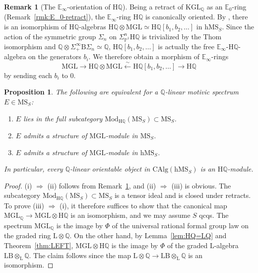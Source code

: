 \documentclass{amsart}
\numberwithin{equation}{section}
\theoremstyle{plain}
\newtheorem{proposition}[equation]{Proposition}
\theoremstyle{definition}
\newtheorem{remark}[equation]{Remark}
\let\bb=\mathbb
\let\rm=\mathrm
\def\Z{\bb Z}
\def\Q{\bb Q}
\def\P{\bb P}
\def\h{\mathrm h}
\def\L{\mathrm{L}{}}
\def\LB{\mathrm{LB}{}}
\def\HH{\mathrm{H}}
\def\E{\mathbb{E}}
\let\cat=\mathrm
\def\MGL{\mathrm{MGL}}
\def\PMGL{\mathrm{PMGL}}
\def\KGL{\mathrm{KGL}}
\def\Mod{\cat{M}\mathrm{od}{}}
\def\MS{\mathrm{MS}}
\def\CAlg{\mathrm{CAlg}{}}
\begin{document}
\begin{remark}[The $\E_\infty$-orientation of $\HH\Q$]
	\label{rmk:HQ-orientation}
	Being a retract of $\KGL_\Q$ as an $\E_0$-ring (Remark~\ref{rmk:E_0-retract}), the $\E_\infty$-ring $\HH\Q$ is canonically oriented.
	By \cite[Corollary 7.10]{AHI}, there is an isomorphism of $\HH\Q$-algebras $\HH\Q\otimes\MGL\simeq \HH\Q[b_1,b_2,\dotsc]$ in $\h\MS_S$.
	Since the action of the symmetric group $\Sigma_n$ on $\Sigma_{\P^1}^{n}\HH\Q$ is trivialized by the Thom isomorphism and $\Q\otimes\Sigma^\infty_+\rm B\Sigma_n\simeq \Q$, $\HH\Q[b_1,b_2,\dotsc]$ is actually the free $\E_\infty$-$\HH\Q$-algebra on the generators $b_i$. We therefore obtain a morphism of $\E_\infty$-rings
	\[
	\MGL \to \HH\Q\otimes\MGL \xleftarrow{\sim} \HH\Q[b_1,b_2,\dotsc] \to \HH\Q
	\]
	by sending each $b_i$ to $0$. %
\end{remark}

\begin{proposition}\label{prop:HQ-modules}
	The following are equivalent for a $\Q$-linear motivic spectrum $E\in \MS_S$:
	\begin{enumerate}
		\item $E$ lies in the full subcategory $\Mod_{\HH\Q}(\MS_S)\subset \MS_S$.
		\item $E$ admits a structure of $\MGL$-module in $\MS_S$.
		\item $E$ admits a structure of $\MGL$-module in $\h\MS_S$.
	\end{enumerate}
	In particular, every $\Q$-linear orientable object in $\CAlg(\h\MS_S)$ is an $\HH\Q$-module.
\end{proposition}

\begin{proof}
	(i) $\Rightarrow$ (ii) follows from Remark~\ref{rmk:HQ-orientation}, and (ii) $\Rightarrow$ (iii) is obvious.
	The subcategory $\Mod_{\HH\Q}(\MS_S)\subset \MS_S$ is a tensor ideal and is closed under retracts. To prove (iii) $\Rightarrow$ (i), it therefore suffices to show that the canonical map $\MGL_\Q\to \MGL\otimes\HH\Q$ is an isomorphism, and we may assume $S$ qcqs.
	The spectrum $\MGL_\Q$ is the image by $\Phi$ of the universal rational formal group law on the graded ring $\L\otimes\Q$.
On the other hand, by Lemma~\ref{lem:HQ=LQ} and Theorem~\ref{thm:LEFT}, $\MGL\otimes \HH\Q$ is the image by $\Phi$ of the graded $\L$-algebra $\LB\otimes_\L\Q$. The claim follows since the map $\L\otimes\Q\to \LB\otimes_\L\Q$ is an isomorphism.
\end{proof}
\end{document}
